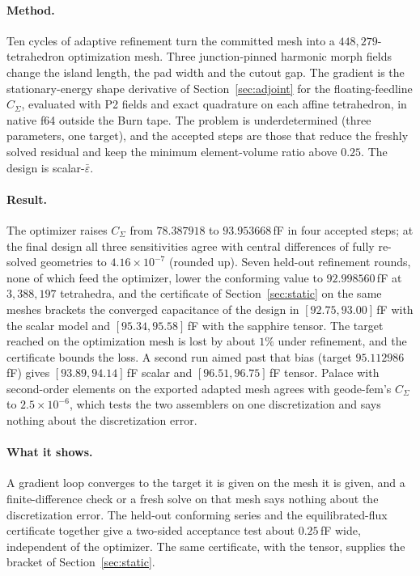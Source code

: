 \documentclass{anvil-paper}
\begin{document}
\paragraph{Method.}
Ten cycles of adaptive refinement turn the committed mesh into a
$448{,}279$-tetrahedron optimization mesh. Three junction-pinned harmonic
morph fields change the island length, the pad width and the cutout gap.
The gradient is the stationary-energy shape derivative of
Section~\ref{sec:adjoint} for the floating-feedline $C_\Sigma$, evaluated
with P2 fields and exact quadrature on each affine tetrahedron, in native
f64 outside the Burn tape. The problem is underdetermined (three
parameters, one target), and the accepted steps are those that reduce the
freshly solved residual and keep the minimum element-volume ratio above
$0.25$. The design is scalar-$\bar\varepsilon$.

\paragraph{Result.}
The optimizer raises $C_\Sigma$ from $78.387918$ to $93.953668$\,fF in four
accepted steps; at the final design all three sensitivities agree with
central differences of fully re-solved geometries to $4.16\times10^{-7}$
(rounded up). Seven held-out refinement rounds, none of which feed the
optimizer, lower the conforming value to $92.998560$\,fF at
$3{,}388{,}197$ tetrahedra, and the certificate of
Section~\ref{sec:static} on the same meshes brackets the converged
capacitance of the design in $[92.75, 93.00]$\,fF with the scalar model
and $[95.34, 95.58]$\,fF with the sapphire tensor. The target reached on
the optimization mesh is lost by about $1\%$ under refinement, and the
certificate bounds the loss. A second run aimed past that bias
(target $95.112986$\,fF) gives $[93.89, 94.14]$\,fF scalar and
$[96.51, 96.75]$\,fF tensor. Palace with second-order elements on the
exported adapted mesh agrees with geode-fem's $C_\Sigma$ to
$2.5\times10^{-6}$, which tests the two assemblers on one discretization
and says nothing about the discretization error.

\paragraph{What it shows.}
A gradient loop converges to the target it is given on the mesh it is
given, and a finite-difference check or a fresh solve on that mesh says
nothing about the discretization error. The held-out conforming series
and the equilibrated-flux certificate together give a two-sided
acceptance test about $0.25$\,fF wide, independent of the optimizer. The
same certificate, with the tensor, supplies the bracket of
Section~\ref{sec:static}.
\end{document}
